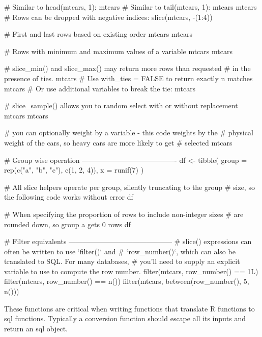 \documentclass[a4paper]{book}
\begin{document}
\begin{Examples}
\begin{ExampleCode}
# Similar to head(mtcars, 1):
mtcars %
# Similar to tail(mtcars, 1):
mtcars %
mtcars %
# Rows can be dropped with negative indices:
slice(mtcars, -(1:4))

# First and last rows based on existing order
mtcars %
mtcars %

# Rows with minimum and maximum values of a variable
mtcars %
mtcars %

# slice_min() and slice_max() may return more rows than requested
# in the presence of ties.
mtcars %
# Use with_ties = FALSE to return exactly n matches
mtcars %
# Or use additional variables to break the tie:
mtcars %

# slice_sample() allows you to random select with or without replacement
mtcars %
mtcars %

# you can optionally weight by a variable - this code weights by the
# physical weight of the cars, so heavy cars are more likely to get
# selected
mtcars %

# Group wise operation ----------------------------------------
df <- tibble(
  group = rep(c("a", "b", "c"), c(1, 2, 4)),
  x = runif(7)
)

# All slice helpers operate per group, silently truncating to the group
# size, so the following code works without error
df %

# When specifying the proportion of rows to include non-integer sizes
# are rounded down, so group a gets 0 rows
df %

# Filter equivalents --------------------------------------------
# slice() expressions can often be written to use `filter()` and
# `row_number()`, which can also be translated to SQL. For many databases,
# you'll need to supply an explicit variable to use to compute the row number.
filter(mtcars, row_number() == 1L)
filter(mtcars, row_number() == n())
filter(mtcars, between(row_number(), 5, n()))
\end{ExampleCode}
\end{Examples}
%
\begin{Description}
These functions are critical when writing functions that translate R
functions to sql functions. Typically a conversion function should escape
all its inputs and return an sql object.
\end{Description}
\end{document}
